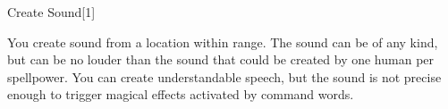 \begin{spellsection}{Create Sound}[1]
    \begin{spellheader}
    \end{spellheader}
    \begin{spellcontent}
        \begin{spelltargetinginfo}
            \spellrng{\rngmed}
        \end{spelltargetinginfo}
        \begin{spelleffects}
            \spelleffect You create sound from a location within range. The sound can be of any kind, but can be no louder than the sound that could be created by one human per spellpower. You can create understandable speech, but the sound is not precise enough to trigger magical effects activated by command words.
            \spelldur \durshort \dismissable
        \end{spelleffects}
    \end{spellcontent}
    \begin{spellfooter}
        \miscastexplode
    \end{spellfooter}
\end{spellsection}

